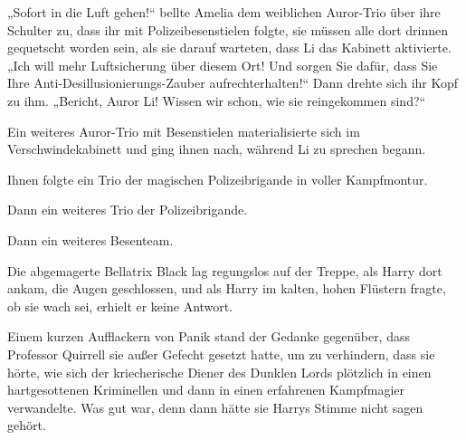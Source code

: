 „Sofort in die Luft gehen!“ bellte Amelia dem weiblichen Auror-Trio über ihre Schulter zu, dass ihr mit Polizeibesenstielen folgte, sie müssen alle dort drinnen gequetscht worden sein, als sie darauf warteten, dass Li das Kabinett aktivierte. „Ich will mehr Luftsicherung über diesem Ort! Und sorgen Sie dafür, dass Sie Ihre Anti-Desillusionierungs-Zauber aufrechterhalten!“ Dann drehte sich ihr Kopf zu ihm. „Bericht, Auror Li! Wissen wir schon, wie sie reingekommen sind?“

Ein weiteres Auror-Trio mit Besenstielen materialisierte sich im Verschwindekabinett und ging ihnen nach, während Li zu sprechen begann.

Ihnen folgte ein Trio der magischen Polizeibrigande in voller Kampfmontur.

Dann ein weiteres Trio der Polizeibrigande.

Dann ein weiteres Besenteam.

\later

Die abgemagerte Bellatrix Black lag regungslos auf der Treppe, als Harry dort ankam, die Augen geschlossen, und als Harry im kalten, hohen Flüstern fragte, ob sie wach sei, erhielt er keine Antwort.

Einem kurzen Aufflackern von Panik stand der Gedanke gegenüber, dass Professor Quirrell sie außer Gefecht gesetzt hatte, um zu verhindern, dass sie hörte, wie sich der kriecherische Diener des Dunklen Lords plötzlich in einen hartgesottenen Kriminellen und dann in einen erfahrenen Kampfmagier verwandelte. Was gut war, denn dann hätte sie Harrys Stimme nicht  sagen gehört.

